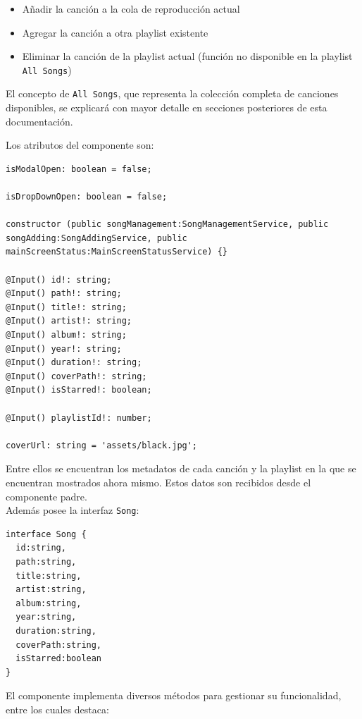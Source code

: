 \documentclass[11pt, a4paper]{article}
\begin{document}
                \begin{itemize}
                    \item Añadir la canción a la cola de reproducción actual
                    \item Agregar la canción a otra playlist existente
                    \item Eliminar la canción de la playlist actual (función no disponible en la playlist \verb|All Songs|)
                \end{itemize}

                El concepto de \verb|All Songs|, que representa la colección completa de canciones disponibles, se explicará con mayor detalle en secciones posteriores de esta documentación.

                Los atributos del componente son:

                \begin{lstlisting}[caption={Atributos Song Button}]
isModalOpen: boolean = false;

isDropDownOpen: boolean = false;

constructor (public songManagement:SongManagementService, public songAdding:SongAddingService, public mainScreenStatus:MainScreenStatusService) {}

@Input() id!: string;
@Input() path!: string;
@Input() title!: string;
@Input() artist!: string;
@Input() album!: string;
@Input() year!: string;
@Input() duration!: string;
@Input() coverPath!: string;
@Input() isStarred!: boolean;

@Input() playlistId!: number;

coverUrl: string = 'assets/black.jpg';
                \end{lstlisting}

                Entre ellos se encuentran los metadatos de cada canción y la playlist en la que se encuentran mostrados ahora mismo. Estos datos son recibidos desde el componente padre. \\

                Además posee la interfaz \verb|Song|:

                \begin{lstlisting}[caption={Song}]
interface Song {
  id:string,
  path:string,
  title:string,
  artist:string,
  album:string,
  year:string,
  duration:string,
  coverPath:string,
  isStarred:boolean
}
                \end{lstlisting}

                El componente implementa diversos métodos para gestionar su funcionalidad, entre los cuales destaca:
\end{document}
